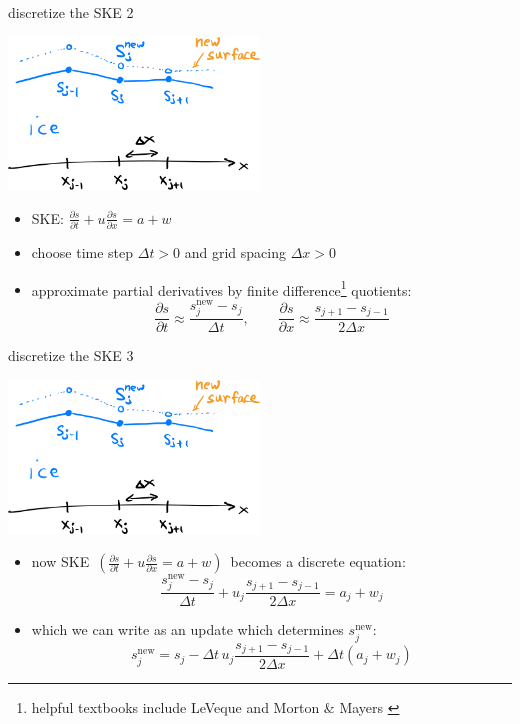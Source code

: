 \documentclass[10pt,dvipsnames]{beamer}
\newcommand{\snew}{s^{\text{new}}}
\begin{document}
\begin{frame}{discretize the SKE 2}
\begin{center}
\includegraphics[width=0.5\textwidth]{surfacenotation}
\end{center}

\begin{itemize}
\item SKE: $\displaystyle \frac{\partial s}{\partial t} + u \frac{\partial s}{\partial x} = a + w$

\smallskip
\item choose time step $\Delta t>0$ and grid spacing $\Delta x>0$
\item approximate partial derivatives by finite difference\footnote{helpful textbooks include LeVeque \cite{Leveque2007} and Morton \& Mayers \cite{MortonMayers2005}} quotients:
    $$\frac{\partial s}{\partial t} \approx \frac{\snew_j - s_j}{\Delta t}, \qquad \frac{\partial s}{\partial x} \approx \frac{s_{j+1} - s_{j-1}}{2\Delta x}$$
\phantom{foo}
\end{itemize}
\end{frame}


\begin{frame}{discretize the SKE 3}
\begin{center}
\includegraphics[width=0.5\textwidth]{surfacenotation}
\end{center}

\begin{itemize}
\item now SKE\, $\left(\frac{\partial s}{\partial t} + u \frac{\partial s}{\partial x} = a + w\right)$\, becomes a discrete equation:
    $$\frac{\snew_j - s_j}{\Delta t} + u_j \frac{s_{j+1} - s_{j-1}}{2\Delta x} = a_j + w_j$$
\item which we can write as an update which determines $\snew_j$:
	$$\snew_j = s_j - \Delta t\, u_j \frac{s_{j+1}-s_{j-1}}{2\Delta x} + \Delta t (a_j + w_j)$$
\end{itemize}
\end{frame}
\end{document}
